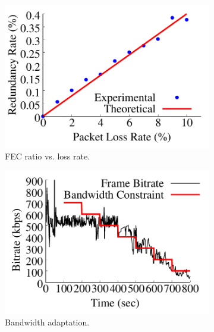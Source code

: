 \begin{figure}[ht]
\centering
  \begin{subfigure}[t]{0.33\textwidth}
    \includegraphics[width=\linewidth]{Figs/RTDrive/evaluation/fec_ratio.pdf}
    \vspace{-0.5cm}
    \caption{FEC ratio vs. loss rate.}
    \label{fec_ratio}
  \end{subfigure}%
  \begin{subfigure}[t]{0.33\textwidth}
    \includegraphics[width=\linewidth]{Figs/RTDrive/evaluation/bandwidth.pdf}
    \vspace{-0.5cm}
    \caption{Bandwidth adaptation.}
    \label{bandwidth}
  \end{subfigure}%
  \begin{subfigure}[t]{0.33\textwidth}

\end{subfigure}
\end{figure}

